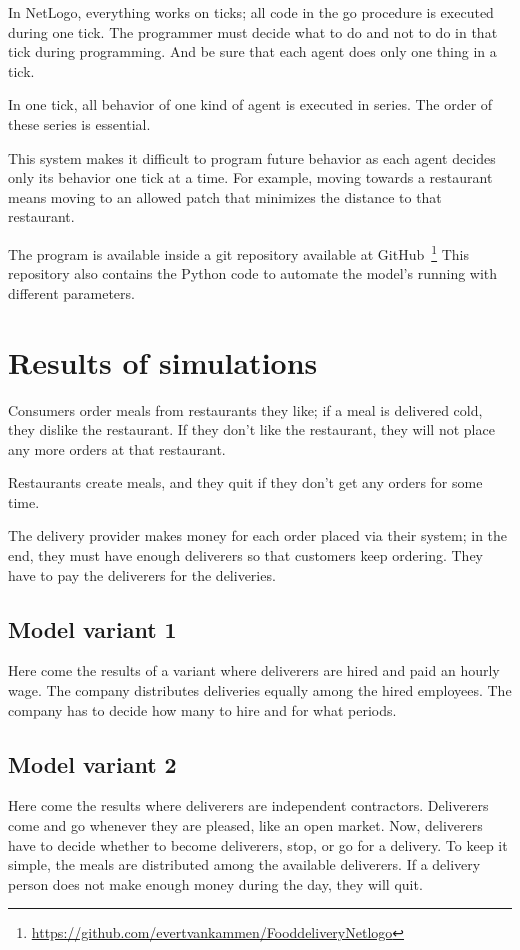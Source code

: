 In NetLogo, everything works on ticks; all code in the go procedure is executed during one tick.
The programmer must decide what to do and not to do in that tick during programming.
And be sure that each agent does only one thing in a tick.

In one tick, all behavior of one kind of agent is executed in series.
The order of these series is essential.

This system makes it difficult to program future behavior as each agent decides only its behavior one tick at a time.
For example, moving towards a restaurant means moving to an allowed patch that minimizes the distance to that restaurant.

The program is available inside a git repository available at GitHub~\footnote{\url{https://github.com/evertvankammen/FooddeliveryNetlogo}}
This repository also contains the Python code to automate the model's running with different parameters.

\section{Results of simulations}\label{sec:results-of-simulations}
Consumers order meals from restaurants they like; if a meal is delivered cold, they dislike the restaurant.
If they don't like the restaurant, they will not place any more orders at that restaurant.

Restaurants create meals, and they quit if they don't get any orders for some time.

The delivery provider makes money for each order placed via their system; in the end, they must have enough deliverers so that
customers keep ordering.
They have to pay the deliverers for the deliveries.



\subsection{Model variant 1}
Here come the results of a variant where deliverers are hired and paid an hourly wage.
The company distributes deliveries equally among the hired employees.
The company has to decide how many to hire and for what periods.


\subsection{Model variant 2}
Here come the results where deliverers are independent contractors.
Deliverers come and go whenever they are pleased, like an open market.
Now, deliverers have to decide whether to become deliverers, stop, or go for a delivery.
To keep it simple, the meals are distributed among the available deliverers.
If a delivery person does not make enough money during the day, they will quit.